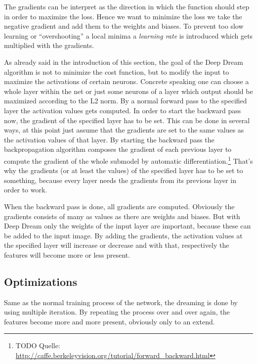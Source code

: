 The gradients can be interpret as the direction in which the function should step in order to maximize the loss.
Hence we want to minimize the loss we take the negative gradient and add them to the weights and biases.
To prevent too slow learning or \enquote{overshooting} a local minima a \emph{learning rate} is introduced which gets multiplied with the gradients.

As already said in the introduction of this section, the goal of the Deep Dream algorithm is not to minimize the cost function, but to modify the input to maximize the activations of certain neurons.
Concrete speaking one can choose a whole layer within the net or just some neurons of a layer which output should be maximized according to the L2 norm.
By a normal forward pass to the specified layer the activation values gets computed.
In order to start the backward pass now, the gradient of the specified layer has to be set.
This can be done in several ways, at this point just assume that the gradients are set to the same values as the
activation values of that layer.
By starting the backward pass the backpropagation algorithm composes the gradient of each previous layer to compute the gradient of the whole submodel by automatic differentiation.\footnote{TODO Quelle: \url{http://caffe.berkeleyvision.org/tutorial/forward_backward.html}}
That's why the gradients (or at least the values) of the specified layer has to be set to something, because every layer needs the gradients from its previous layer in order to work.


When the backward pass is done, all gradients are computed.
Obviously the gradients consists of many as values as there are weights and biases.
But with Deep Dream only the weights of the input layer are important, because these can be added to the input image.
By adding the gradients, the activation values at the specified layer will increase or decrease and with that, respectively the features will become more or less present.

\subsection{Optimizations}
\label{sec:optimizations}
Same as the normal training process of the network, the dreaming is done by using multiple iteration.
By repeating the process over and over again, the features become more and more present, obviously only to an extend.

